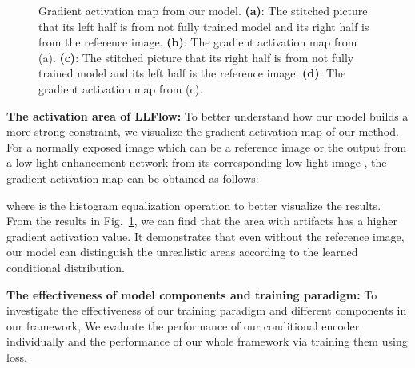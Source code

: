 \documentclass[letterpaper]{article} \usepackage{aaai22}  \usepackage{times}  \usepackage{helvet}  \usepackage{courier}  \usepackage[hyphens]{url}  \usepackage{graphicx} \urlstyle{rm} \def\UrlFont{\rm}  \usepackage{natbib}  \usepackage{caption} \usepackage{subfigure}
\newcommand{\yufei}[1]{{#1}}
\newcommand{\wh}[1]{{#1}}
\begin{document}
\begin{figure}[htbp]
    \centering
    \hspace{-9pt}
    \hspace{-9pt}
    \hspace{-9pt}
    \hspace{-9pt}
    \caption{
    Gradient activation map from our model. \textbf{(a)}: The stitched picture that its left half is \yufei{from not fully trained model} and its right half is from the reference image. \textbf{(b)}: The gradient activation map from (a). \textbf{(c)}: The stitched picture that its right half is \yufei{from not fully trained model} and its left half is the reference image. \textbf{(d)}: The gradient activation map from (c).}
    \label{fig:grad_act}
    \vspace{-0.6cm}
\end{figure}

\noindent \wh{3)} \textbf{The \yufei{activation} area of LLFlow:} To better understand \wh{how our model builds a more strong constraint}, we visualize the gradient activation map of our method. For a \wh{normally} exposed image  which can be a reference image or the output from a low-light enhancement network from its corresponding low-light image , the gradient activation map  can be obtained as follows:

where  is the histogram equalization operation \wh{to better visualize the results}. From the results in \wh{Fig.}~\ref{fig:grad_act}, we can find that the area with artifacts has a higher gradient activation value.
\wh{It} demonstrates that even without the reference image, our model can distinguish the unrealistic areas according to the learned conditional distribution.



\noindent \wh{4)} \textbf{The effectiveness of model components and training paradigm:} To investigate the effectiveness of our training paradigm and different components in our framework\wh{,} We evaluate the performance of our conditional encoder individually and the performance of our whole framework via training them using  loss.
\end{document}

